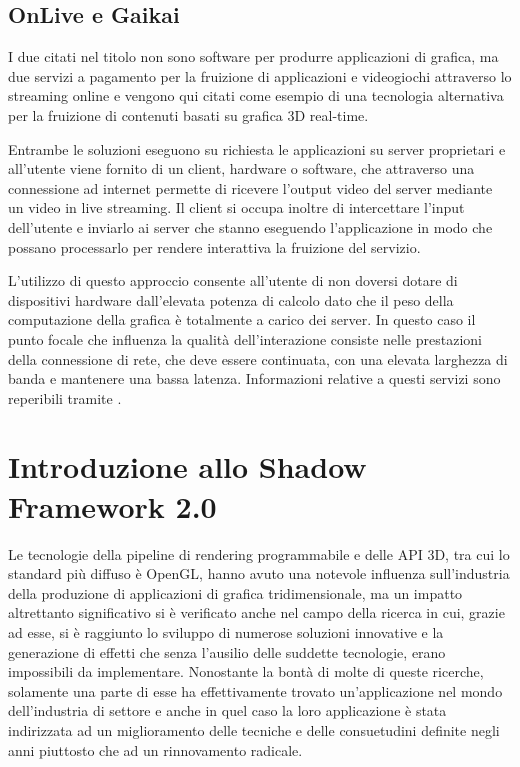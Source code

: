 \subsection{OnLive e Gaikai}
I due citati nel titolo non sono software per produrre applicazioni di grafica, ma due servizi a pagamento per la fruizione di applicazioni e videogiochi attraverso lo streaming online e vengono qui citati come esempio di una tecnologia alternativa per la fruizione di contenuti basati su grafica 3D real-time. 

Entrambe le soluzioni eseguono su richiesta le applicazioni su server proprietari e all'utente viene fornito di un client, hardware o software, che attraverso una connessione ad internet permette di ricevere l'output video del server mediante un video in live streaming. Il client si occupa inoltre di intercettare l'input dell'utente e inviarlo ai server che stanno eseguendo l'applicazione in modo che possano processarlo per rendere interattiva la fruizione del servizio.

L'utilizzo di questo approccio consente all'utente di non doversi dotare di dispositivi hardware dall'elevata potenza di calcolo dato che il peso della computazione della grafica è totalmente a carico dei server. In questo caso il punto focale che influenza la qualità dell'interazione consiste nelle prestazioni della connessione di rete, che deve essere continuata, con una elevata larghezza di banda e mantenere una bassa latenza.
Informazioni relative a questi servizi sono reperibili tramite \cite{site:onlive,site:gaikai}.

\section{Introduzione allo Shadow Framework 2.0}
\label{sec:sfintro}
Le tecnologie della pipeline di rendering programmabile e delle \ac{API} 3D, tra cui lo standard più diffuso è OpenGL, hanno avuto una notevole influenza sull'industria della produzione di applicazioni di grafica tridimensionale, ma un impatto altrettanto significativo si è verificato anche nel campo della ricerca in cui, grazie ad esse, si è raggiunto lo sviluppo di numerose soluzioni innovative e la generazione di effetti che senza l'ausilio delle suddette tecnologie, erano impossibili da implementare.
Nonostante la bontà di molte di queste ricerche, solamente una parte di esse ha effettivamente trovato un'applicazione nel mondo dell'industria di settore e anche in quel caso la loro applicazione è stata indirizzata ad un miglioramento delle tecniche e delle consuetudini definite negli anni piuttosto che ad un rinnovamento radicale.

